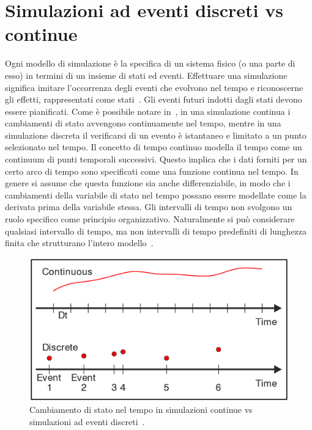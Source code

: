 \documentclass[12pt,a4paper,openright,twoside]{book}
\begin{document}
\section{Simulazioni ad eventi discreti vs continue}
Ogni modello di simulazione è la specifica di un sistema fisico (o una parte di esso) in termini di un insieme di stati ed eventi. 
Effettuare una simulazione significa imitare l'occorrenza degli eventi che evolvono nel tempo e riconoscerne gli effetti, rappresentati come stati~\cite{PDES}. 
Gli eventi futuri indotti dagli stati devono essere pianificati. Come è possibile notare in~, in una simulazione continua i cambiamenti di stato avvengono continuamente nel tempo, mentre in una simulazione discreta il verificarsi di un evento è istantaneo e limitato a un punto selezionato nel tempo. 
Il concetto di tempo continuo modella il tempo come un continuum di punti temporali successivi. Questo implica che i dati forniti per un certo arco di tempo sono specificati come una funzione continua nel tempo. In genere si assume che questa funzione sia anche differenziabile, in modo che i cambiamenti della variabile di stato nel tempo possano essere modellate come la derivata prima della variabile stessa. Gli intervalli di tempo non svolgono un ruolo specifico come principio organizzativo. Naturalmente si può considerare qualsiasi intervallo di tempo, ma non intervalli di tempo predefiniti di lunghezza finita che strutturano l'intero modello~\cite{Ossimitz2008TheBO}. 
\begin{figure}
    \centering
    \includegraphics[width=.8\linewidth]{figures/discrete-event-simulation/Discrete-vs-Continuous-Simulation.png}
    \caption{Cambiamento di stato nel tempo in simulazioni continue vs simulazioni ad eventi discreti~\cite{Helal2008AHS}.}
    \label{fig:Continuous-vs-Discrete}
\end{figure}
\end{document}
